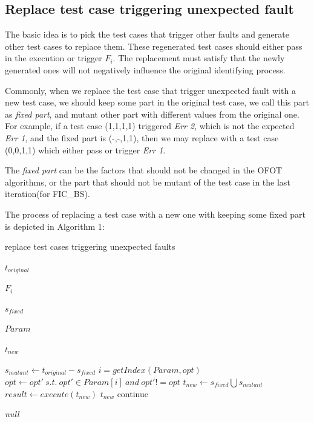 \documentclass{sig-alternate}
\begin{document}
\subsection{Replace test case triggering unexpected fault}

The basic idea is to pick the test cases that trigger other faults and generate other test cases to replace them. These regenerated test cases should either pass in the execution or trigger $F_{i}$. The replacement must satisfy that the newly generated ones will not negatively influence the original identifying process.

Commonly, when we replace the test case that trigger unexpected fault with a new test case, we should keep some part in the original test case, we call this part as \emph{fixed part}, and mutant other part with different values from the original one. For example, if a test case (1,1,1,1) triggered \emph{Err 2}, which is not the expected \emph{Err 1}, and the fixed part is (-,-,1,1), then we may replace with a test case (0,0,1,1) which either pass or trigger \emph{Err 1}.

The \emph{fixed part} can be the factors that should not be changed in the OFOT algorithms, or the part that should not be mutant of the test case in the last iteration(for FIC\_BS).

The process of replacing a test case with a new one with keeping some fixed part is depicted in Algorithm 1:

\begin{algorithm}
  \caption{replace test cases triggering unexpected faults}
  \begin{algorithmic}[1]
     \Require

     $t_{original}$ 

     $F_{i}$ 

     $s_{fixed}$ 

     $Param$ 


     \Ensure  $t_{new}$ 

       \State $s_{mutant} \leftarrow t_{original} - s_{fixed}$
          \State $i = getIndex(Param,opt) $
          \State $opt \leftarrow opt' \ s.t.\ opt' \in Param[i]\ and\ opt' != opt$
       \EndFor
       \State $t_{new} \leftarrow s_{fixed} \bigcup s_{mutant} $
       \State $result \leftarrow execute(t_{new})$
         \State \Return $t_{new}$
       \Else
         \State continue
       \EndIf
     \EndWhile

     \State \Return \emph{null}
  \end{algorithmic}
\end{algorithm}
\end{document}
